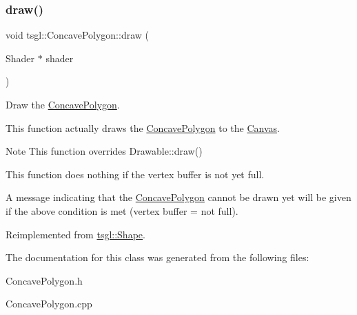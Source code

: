 \subsubsection{\texorpdfstring{draw()}{draw()}}
{\footnotesize\ttfamily void tsgl\+::\+Concave\+Polygon\+::draw (\begin{DoxyParamCaption}\item[{Shader $\ast$}]{shader }\end{DoxyParamCaption})\hspace{0.3cm}{\ttfamily [virtual]}}



Draw the \hyperlink{classtsgl_1_1_concave_polygon}{Concave\+Polygon}. 

This function actually draws the \hyperlink{classtsgl_1_1_concave_polygon}{Concave\+Polygon} to the \hyperlink{classtsgl_1_1_canvas}{Canvas}. \begin{DoxyNote}{Note}
This function overrides Drawable\+::draw() 

This function does nothing if the vertex buffer is not yet full. 

A message indicating that the \hyperlink{classtsgl_1_1_concave_polygon}{Concave\+Polygon} cannot be drawn yet will be given if the above condition is met (vertex buffer = not full). 
\end{DoxyNote}


Reimplemented from \hyperlink{classtsgl_1_1_shape_ae0905e73f1652d92cef9c7f2c38572f3}{tsgl\+::\+Shape}.



The documentation for this class was generated from the following files\+:\begin{DoxyCompactItemize}
\item 
Concave\+Polygon.\+h\item 
Concave\+Polygon.\+cpp\end{DoxyCompactItemize}
